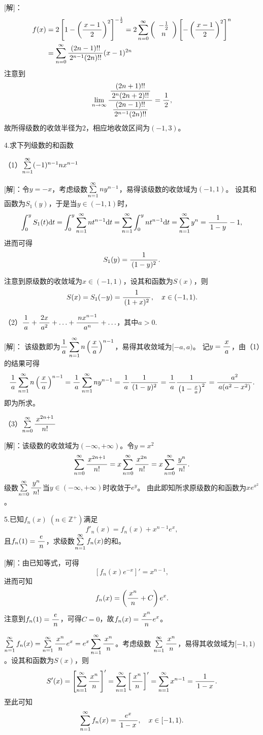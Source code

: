 [解]：
\begin{align*}
	f(x)
	&=2\left[1-\left(\df{x-1}2\right)^2\right]^{-\frac12}
	=2\sumn[0]{\left(\begin{array}{c}
		-\frac12 \\ n
	\end{array}\right)}\left[-\left(\df{x-1}2\right)^2\right]^n\\
	&=\sumn[0]\df{(2n-1)!!}{2^{n-1}(2n)!!}(x-1)^{2n}
\end{align*}
注意到
$$\limn\df{\df{(2n+1)!!}{2^{n}(2n+2)!!}}{\df{(2n-1)!!}{2^{n-1}(2n)!!}}=\df12,$$
故所得级数的收敛半径为$2$，相应地收敛区间为$(-1,3)$。
\fin

\bs

4.求下列级数的和函数

（1）$\sumn(-1)^{n-1}nx^{n-1}$

[解]：令$y=-x$，考虑级数$\sumn ny^{n-1}$，易得该级数的收敛域为$(-1,1)$。
设其和函数为$S_1(y)$，于是当$y\in(-1,1)$时，
$$\dint_0^yS_1(t)\d t=\dint_0^y\sumn nt^{n-1}\d t
=\sumn \dint_0^ynt^{n-1}\d t=\sumn y^n=\df1{1-y}-1,$$
进而可得
$$S_1(y)=\df1{(1-y)^2}.$$

注意到原级数的收敛域为$x\in(-1,1)$，设其和函数为$S(x)$，则
$$S(x)=S_1(-y)=\df1{(1+x)^2},\quad x\in(-1,1).$$

（2）$\df1a+\df{2x}{a^2}+\ldots+\df{nx^{n-1}}{a^n}+\ldots$，其中$a>0$.

[解]：
该级数即为$\df1a\sumn n\left(\df xa\right)^{n-1}$，易得其收敛域为$[-a,a)$。
记$y=\df xa$，由（1）的结果可得
$$\df1a\sumn n\left(\df xa\right)^{n-1}
=\df1a\sumn ny^{n-1}=\df1a\df1{(1-y)^2}=\df1a\df1{\left(1-\frac xa\right)^2}
=\df{a^2}{a(a^2-x^2)}.$$
即为所求。

（3）$\sumn[0]\df{x^{2n+1}}{n!}$

[解]：该级数的收敛域为$(-\infty,+\infty)$。令$y=x^2$
$$\sumn[0]\df{x^{2n+1}}{n!}=x\sumn[0]\df{x^{2n}}{n!}
=x\sumn[0]\df{y^n}{n!}.$$
级数$\sumn[0]\df{y^n}{n!}$当$y\in(-\infty,+\infty)$时收敛于$e^y$。
由此即知所求原级数的和函数为$xe^{x^2}$。
\fin

\bs

5.已知$f_n(x)\;(n\in\mathbb{Z}^+)$满足
$$f'_n(x)=f_n(x)+x^{n-1}e^x,$$
且$f_n(1)=\df en$，求级数$\sumn f_n(x)$的和。

[解]：由已知等式，可得
$$\left[f_n(x)e^{-x}\right]'=x^{n-1},$$
进而可知
$$f_n(x)=\left(\df{x^n}n+C\right)e^x.$$
注意到$f_n(1)=\df en$，可得$C=0$，故$f_n(x)=\df{x^n}ne^x$。

$\sumn f_n(x)=\sumn\df{x^n}ne^x=e^x\sumn\df{x^n}n$。考虑级数
$\sumn\df{x^n}n$，易得其收敛域为$[-1,1)$。设其和函数为$S(x)$，则
$$S'(x)=\left[\sumn\df{x^n}n\right]'
=\sumn\left[\df{x^n}n\right]'=\sumn x^{n-1}=\df1{1-x}.$$
至此可知
$$\sumn f_n(x)=\df{e^x}{1-x},\quad x\in[-1,1).$$
\fin

